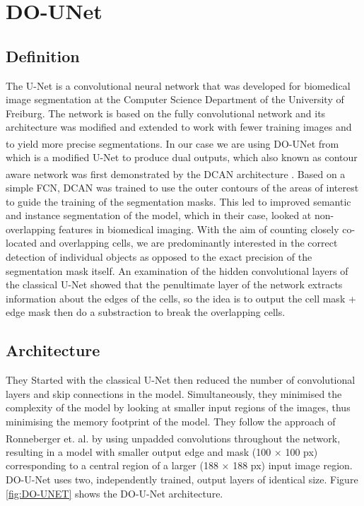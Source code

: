 \section{DO-UNet}
\subsection{Definition}
\hspace{\parindent}
The U-Net is a convolutional neural network that was developed for biomedical image segmentation at the Computer Science Department of the University of Freiburg. The network is based on the fully convolutional network and its architecture was modified and extended to work with fewer training images and to yield more precise segmentations. In our case we are using DO-UNet from \textsuperscript{\cite{10.1007/978-3-030-44584-3_31}} which is a modified U-Net to produce dual outputs, which also known as contour aware network was first demonstrated by the DCAN architecture \textsuperscript{\cite{chen2016dcan}}.  Based on a simple FCN, DCAN was trained to use the outer
contours of the areas of interest to guide the training of the segmentation masks. This led to improved semantic and instance segmentation of the model, which in their case, looked at non-overlapping features in biomedical imaging.
With the aim of counting closely co-located and overlapping cells, we are predominantly interested in the correct detection of individual objects as
opposed to the exact precision of the segmentation mask itself. An examination
of the hidden convolutional layers of the classical U-Net showed that the penultimate layer of the network extracts information about the edges of the cells, so the idea is to output the cell mask + edge mask then do a substraction to break the overlapping cells.

\subsection{Architecture}
\hspace{\parindent}
They Started with the classical U-Net then reduced the number of
convolutional layers and skip connections in the model. Simultaneously, they minimised the complexity of the model by looking at smaller input regions of the images, thus minimising the memory footprint of the model. They follow the approach of Ronneberger et. al. \textsuperscript{\cite{10.1007/978-3-030-44584-3_31}} by using unpadded convolutions throughout the network, resulting in a model with smaller output edge and mask (100 × 100 px) corresponding to a central region of a larger (188 × 188 px) input image region. DO-U-Net uses two, independently trained, output layers of identical size. Figure \ref{fig:DO-UNET} shows the DO-U-Net architecture.

